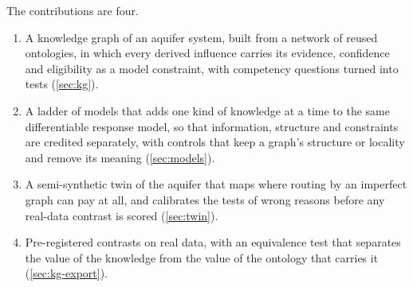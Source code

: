 The contributions are four.
\begin{enumerate}
\item A knowledge graph of an aquifer system, built from a network of reused ontologies, in which
  every derived influence carries its evidence, confidence and eligibility as a model constraint,
  with competency questions turned into tests (\cref{sec:kg}).
\item A ladder of models that adds one kind of knowledge at a time to the same differentiable
  response model, so that information, structure and constraints are credited separately, with
  controls that keep a graph's structure or locality and remove its meaning (\cref{sec:models}).
\item A semi-synthetic twin of the aquifer that maps where routing by an imperfect graph can pay at
  all, and calibrates the tests of wrong reasons before any real-data contrast is scored
  (\cref{sec:twin}).
\item Pre-registered contrasts on real data, with an equivalence test that separates the value of
  the knowledge from the value of the ontology that carries it (\cref{sec:kg-export}).
\end{enumerate}
